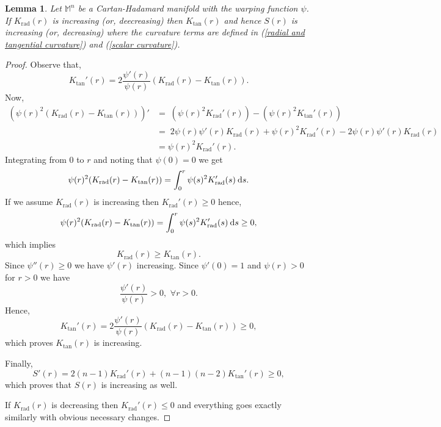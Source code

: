 \documentclass[a4paper,11pt,reqno]{amsart}
\renewcommand\eqref[1]{(\ref{#1})}
\theoremstyle{plain}
\newtheorem{lemma}{Lemma}[section]
\numberwithin{equation}{section} \allowdisplaybreaks
\newcommand{\m}{\mathbb{M}^n}
\newcommand{\ds}{\:{\rm d}s}
\begin{document}
\begin{lemma}\label{k to S}
   Let $\m$ be a Cartan-Hadamard manifold with the warping function $\psi$. If $K_{\mathrm{rad}}(r)$ is increasing (or, deecreasing) then $K_{\text{tan}}(r)$ and hence $S(r)$ is increasing (or, decreasing) where the curvature terms are defined in \eqref{radial and tangential curvature} and \eqref{scalar curvature}.
\end{lemma}
\begin{proof}
    Observe that,
    \begin{equation*}
        K_{\mathrm{tan}}'(r)=2\frac{\psi'(r)}{\psi(r)}\left(K_{\mathrm{rad}}(r)-K_{\mathrm{tan}}(r)\right).
    \end{equation*}
Now,
\begin{align*}
    (\psi(r)^2(K_{\mathrm{rad}}(r)-K_{\mathrm{tan}}(r)))'
    &= \; (\psi(r)^2K_{\text{rad}}'(r))-(\psi(r)^2K_{\text{tan}}'(r))\\
    & = \; 2\psi(r)\psi'(r)K_{\text{rad}}(r)+\psi(r)^2K_{\text{rad}}'(r)-2\psi(r)\psi'(r)K_{\text{rad}}(r)\\
  &  =\psi(r)^2K_{\text{rad}}'(r).
\end{align*}
Integrating from $0$ to $r$ and noting that $\psi(0)=0$ we get
\begin{equation*}
    \psi(r)^2(K_{\text{rad}}(r)-K_{\text{tan}}(r))=\int_0^r\psi(s)^2K_{\text{rad}}'(s)\ds.
\end{equation*}
If we assume $K_{\text{rad}}(r)$ is increasing then $K_{\text{rad}}'(r)\geq 0$ hence,
\begin{equation*}
    \psi(r)^2(K_{\text{rad}}(r)-K_{\text{tan}}(r))=\int_0^r\psi(s)^2K_{\text{rad}}'(s)\ds \geq 0,
\end{equation*}
which implies
\begin{equation*}
    K_{\text{rad}}(r) \geq K_{\text{tan}}(r).
\end{equation*}
Since $\psi''(r) \geq 0$ we have $\psi'(r)$ increasing. Since $\psi'(0)=1$ and $\psi(r)>0$ for $r>0$ we have
\begin{equation*}
    \frac{\psi'(r)}{\psi(r)}>0,\,\, \forall r >0.
\end{equation*}
Hence,
\begin{equation*}
    K_{\text{tan}}'(r)=2\frac{\psi'(r)}{\psi(r)}(K_{\text{rad}}(r)-K_{\text{tan}}(r)) \geq 0,
\end{equation*}
which proves $K_{\text{tan}}(r)$ is increasing.\par Finally,
\begin{equation*}
    S'(r)= 2(n-1)K_{\text{rad}}'(r)+(n-1)(n-2)K_{\text{tan}}'(r) \geq 0,
\end{equation*}
which proves that $S(r)$ is increasing as well.\par If $K_{\text{rad}}(r)$ is decreasing then $K_{\text{rad}}'(r) \leq 0$ and everything goes exactly similarly with obvious necessary changes.
\end{proof}
\end{document}

